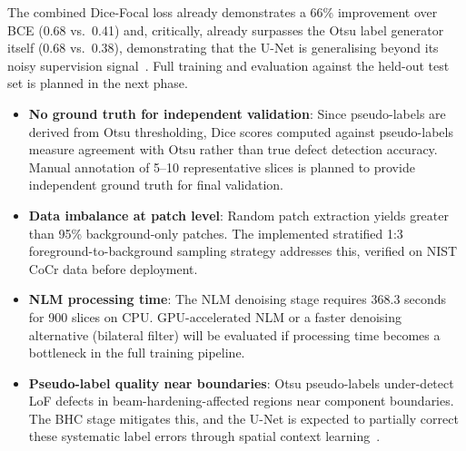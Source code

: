 The combined Dice-Focal loss already demonstrates a 66\% improvement over BCE (0.68 vs.\ 0.41) and,
critically, already surpasses the Otsu label generator itself (0.68 vs.\ 0.38), demonstrating that the
U-Net is generalising beyond its noisy supervision signal~\citep{Yosifov2020}. Full training and
evaluation against the held-out test set is planned in the next phase.

\begin{itemize}
\item \textbf{No ground truth for independent validation}: Since pseudo-labels are derived from Otsu
  thresholding, Dice scores computed against pseudo-labels measure agreement with Otsu rather than
  true defect detection accuracy. Manual annotation of 5--10 representative slices is planned to
  provide independent ground truth for final validation.
\item \textbf{Data imbalance at patch level}: Random patch extraction yields greater than 95\%
  background-only patches. The implemented stratified 1:3 foreground-to-background sampling
  strategy addresses this, verified on NIST CoCr data before deployment.
\item \textbf{NLM processing time}: The NLM denoising stage requires 368.3 seconds for 900 slices on
  CPU. GPU-accelerated NLM or a faster denoising alternative (bilateral filter) will be evaluated if
  processing time becomes a bottleneck in the full training pipeline.
\item \textbf{Pseudo-label quality near boundaries}: Otsu pseudo-labels under-detect LoF defects in
  beam-hardening-affected regions near component boundaries. The BHC stage mitigates this, and the
  U-Net is expected to partially correct these systematic label errors through spatial context
  learning~\citep{Yosifov2020}.
\end{itemize}
